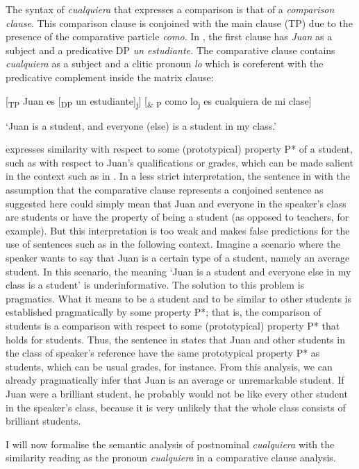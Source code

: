 \documentclass[output=paper]{langscibook}
\begin{document}
  The syntax of \textit{cualquiera} that expresses a comparison is that of a \textit{comparison clause}. This comparison clause is conjoined with the main clause (TP) due to the presence of the comparative particle \textit{como}. In , the first clause has \textit{Juan} as a subject and a predicative DP \textit{un estudiante.} The comparative clause contains \textit{cualquiera} as a subject and a clitic pronoun \textit{lo} which is coreferent with the predicative complement inside the matrix clause:

\label{bkm:Ref72354100}  [\textsubscript{TP} Juan es [\textsubscript{DP} un estudiante]\textsubscript{j}] [\textsubscript{\& P} como lo\textsubscript{j} es cualquiera de mi clase]

  ‘Juan is a student, and everyone (else) is a student in my class.’

 expresses similarity with respect to some (prototypical) property P* of a student, such as with respect to Juan’s qualifications or grades, which can be made salient in the context such as in . In a less strict interpretation, the sentence in  with the assumption that the comparative clause represents a conjoined sentence as suggested here could simply mean that Juan and everyone in the speaker’s class are students or have the property of being a student (as opposed to teachers, for example). But this interpretation is too weak and makes false predictions for the use of sentences such as  in the following context. Imagine a scenario where the speaker wants to say that Juan is a certain type of a student, namely an average student. In this scenario, the meaning ‘Juan is a student and everyone else in my class is a student’ is underinformative. The solution to this problem is pragmatics. What it means to be a student and to be similar to other students is established pragmatically by some property P*; that is, the comparison of students is a comparison with respect to some (prototypical) property P* that holds for students. Thus, the sentence in  states that Juan and other students in the class of speaker’s reference have the same prototypical property P* as students, which can be usual grades, for instance. From this analysis, we can already pragmatically infer that Juan is an average or unremarkable student. If Juan were a brilliant student, he probably would not be like every other student in the speaker’s class, because it is very unlikely that the whole class consists of brilliant students. 

  I will now formalise the semantic analysis of postnominal \textit{cualquiera} with the similarity reading as the pronoun \textit{cualquiera} in a comparative clause analysis.
\end{document}

